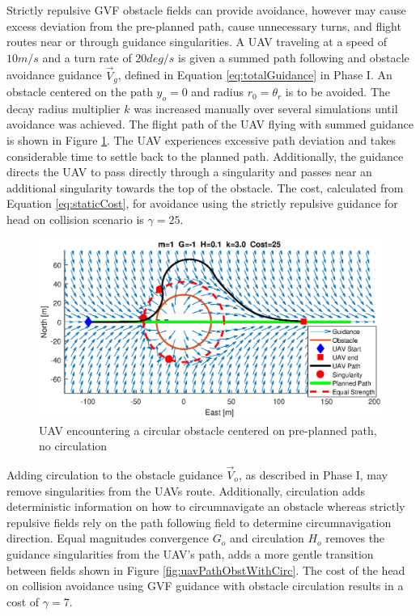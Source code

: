 \documentclass[numbered,pdftex]{ohio-etd}
\begin{document}
 
 Strictly repulsive GVF obstacle fields can provide avoidance, however may cause excess deviation from the pre-planned path, cause unnecessary turns, and flight routes near or through guidance singularities. A UAV traveling at a speed of $10m/s$ and a turn rate of $20 deg/s$ is given a summed path following and obstacle avoidance guidance $\overrightarrow{V}_g$, defined in Equation \ref{eq:totalGuidance} in Phase I. An obstacle centered on the path $y_o=0$ and radius $r_0 = \theta_r$ is to be avoided. The decay radius multiplier $k$ was increased manually over several simulations until avoidance was achieved. The flight path of the UAV flying with summed guidance is shown in Figure \ref{fig:uavPathObstNoCirc}. The UAV experiences excessive path deviation and takes considerable time to settle back to the planned path. Additionally, the guidance directs the UAV to pass directly through a singularity and passes near an additional singularity towards the top of the obstacle. The cost, calculated from Equation \ref{eq:staticCost}, for avoidance using the strictly repulsive guidance for head on collision scenario is $\gamma=25$.
 

\begin{figure}[H]
	\centering
	\includegraphics[trim=0 85 0 85,clip,width=15cm]{PaperFigures/Methods/bruteForceSolveN1V10}
	\caption{UAV encountering a circular obstacle centered on pre-planned path, no circulation}
	\label{fig:uavPathObstNoCirc}
\end{figure}

Adding circulation to the obstacle guidance $\overrightarrow{V}_o$, as described in Phase I, may remove singularities from the UAVs route. Additionally, circulation adds deterministic information on how to circumnavigate an obstacle whereas strictly repulsive fields rely on the path following field to determine circumnavigation direction. Equal magnitudes convergence $G_o$ and circulation $H_o$ removes the guidance singularities from the UAV's path, adds a more gentle transition between fields shown in Figure \ref{fig:uavPathObstWithCirc}. The cost of the head on collision avoidance using GVF guidance with obstacle circulation results in a cost of $\gamma=7$.
\end{document}
